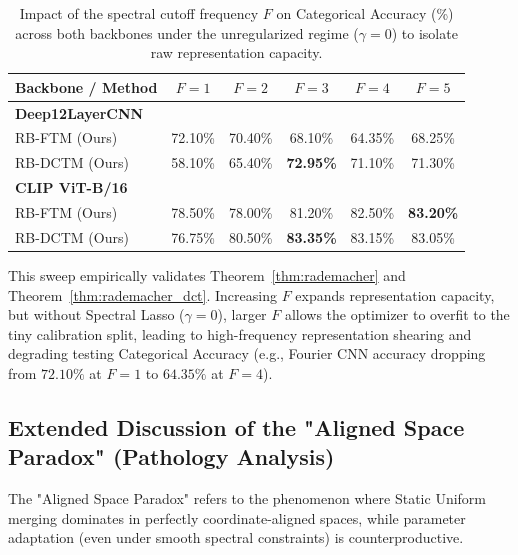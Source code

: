 \begin{table}[h]
\caption{Impact of the spectral cutoff frequency $F$ on Categorical Accuracy (\%) across both backbones under the unregularized regime ($\gamma = 0$) to isolate raw representation capacity.}
\label{tab:frequency_sweep_appendix}
\vskip 0.15in
\begin{center}
\begin{small}
\begin{sc}
\begin{tabular}{lccccc}
\toprule
Backbone / Method & $F=1$ & $F=2$ & $F=3$ & $F=4$ & $F=5$ \\
\midrule
\textbf{Deep12LayerCNN} & & & & & \\
\quad RB-FTM (Ours) & 72.10\% & 70.40\% & 68.10\% & 64.35\% & 68.25\% \\
\quad RB-DCTM (Ours) & 58.10\% & 65.40\% & \textbf{72.95\%} & 71.10\% & 71.30\% \\
\midrule
\textbf{CLIP ViT-B/16} & & & & & \\
\quad RB-FTM (Ours) & 78.50\% & 78.00\% & 81.20\% & 82.50\% & \textbf{83.20\%} \\
\quad RB-DCTM (Ours) & 76.75\% & 80.50\% & \textbf{83.35\%} & 83.15\% & 83.05\% \\
\bottomrule
\end{tabular}
\end{sc}
\end{small}
\end{center}
\vskip -0.1in
\end{table}

This sweep empirically validates Theorem~\ref{thm:rademacher} and Theorem~\ref{thm:rademacher_dct}. Increasing $F$ expands representation capacity, but without Spectral Lasso ($\gamma=0$), larger $F$ allows the optimizer to overfit to the tiny calibration split, leading to high-frequency representation shearing and degrading testing Categorical Accuracy (e.g., Fourier CNN accuracy dropping from $72.10\%$ at $F=1$ to $64.35\%$ at $F=4$).


\subsection{Extended Discussion of the "Aligned Space Paradox" (Pathology Analysis)}
\label{sec:appendix_pathology}

The "Aligned Space Paradox" refers to the phenomenon where Static Uniform merging dominates in perfectly coordinate-aligned spaces, while parameter adaptation (even under smooth spectral constraints) is counterproductive. 

